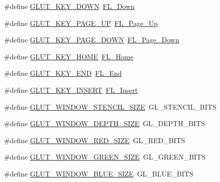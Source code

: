 \begin{DoxyCompactItemize}
\item 
\#define \hyperlink{glut_8_h_acf185aebae7f4bee9d4e95e0e889baa7}{G\+L\+U\+T\+\_\+\+K\+E\+Y\+\_\+\+D\+O\+WN}~\hyperlink{_enumerations_8_h_a7b70dabd5fc84d90552442584a0e8b91}{F\+L\+\_\+\+Down}
\item 
\#define \hyperlink{glut_8_h_a28093e59b0ac1a1a25790fe45413db52}{G\+L\+U\+T\+\_\+\+K\+E\+Y\+\_\+\+P\+A\+G\+E\+\_\+\+UP}~\hyperlink{_enumerations_8_h_a35834a5c204afffb06374e25734b5c76}{F\+L\+\_\+\+Page\+\_\+\+Up}
\item 
\#define \hyperlink{glut_8_h_ada3e1475a629486163f75867350cddb4}{G\+L\+U\+T\+\_\+\+K\+E\+Y\+\_\+\+P\+A\+G\+E\+\_\+\+D\+O\+WN}~\hyperlink{_enumerations_8_h_ada4d587d21ab710f44043dafba88e110}{F\+L\+\_\+\+Page\+\_\+\+Down}
\item 
\#define \hyperlink{glut_8_h_adf559535a9b6a83e60e19b503cbd8267}{G\+L\+U\+T\+\_\+\+K\+E\+Y\+\_\+\+H\+O\+ME}~\hyperlink{_enumerations_8_h_a6fecadc9ecc21f06822c79ced2e45932}{F\+L\+\_\+\+Home}
\item 
\#define \hyperlink{glut_8_h_a8e90fbfbeea6c49891e022e07c9de056}{G\+L\+U\+T\+\_\+\+K\+E\+Y\+\_\+\+E\+ND}~\hyperlink{_enumerations_8_h_a3278d6209799b821e07369aa5dc140ac}{F\+L\+\_\+\+End}
\item 
\#define \hyperlink{glut_8_h_a73eebf3d2d1ccd5ce867a608e0e2a751}{G\+L\+U\+T\+\_\+\+K\+E\+Y\+\_\+\+I\+N\+S\+E\+RT}~\hyperlink{_enumerations_8_h_ae18bfb47b2b5d5579d227d522a3ce32c}{F\+L\+\_\+\+Insert}
\item 
\#define \hyperlink{glut_8_h_adb9314f66a8f824f71322454decee406}{G\+L\+U\+T\+\_\+\+W\+I\+N\+D\+O\+W\+\_\+\+S\+T\+E\+N\+C\+I\+L\+\_\+\+S\+I\+ZE}~G\+L\+\_\+\+S\+T\+E\+N\+C\+I\+L\+\_\+\+B\+I\+TS
\item 
\#define \hyperlink{glut_8_h_a75550c7d5af9c48876449d0a1a2cb399}{G\+L\+U\+T\+\_\+\+W\+I\+N\+D\+O\+W\+\_\+\+D\+E\+P\+T\+H\+\_\+\+S\+I\+ZE}~G\+L\+\_\+\+D\+E\+P\+T\+H\+\_\+\+B\+I\+TS
\item 
\#define \hyperlink{glut_8_h_a44509f72b4642ec2eec721327cd1fb7f}{G\+L\+U\+T\+\_\+\+W\+I\+N\+D\+O\+W\+\_\+\+R\+E\+D\+\_\+\+S\+I\+ZE}~G\+L\+\_\+\+R\+E\+D\+\_\+\+B\+I\+TS
\item 
\#define \hyperlink{glut_8_h_a3ab3056f0fe86d066fa89af6cde18ed8}{G\+L\+U\+T\+\_\+\+W\+I\+N\+D\+O\+W\+\_\+\+G\+R\+E\+E\+N\+\_\+\+S\+I\+ZE}~G\+L\+\_\+\+G\+R\+E\+E\+N\+\_\+\+B\+I\+TS
\item 
\#define \hyperlink{glut_8_h_abdf4e98e2114bc0707239ea8019a9be9}{G\+L\+U\+T\+\_\+\+W\+I\+N\+D\+O\+W\+\_\+\+B\+L\+U\+E\+\_\+\+S\+I\+ZE}~G\+L\+\_\+\+B\+L\+U\+E\+\_\+\+B\+I\+TS
\item 

\end{DoxyCompactItemize}

